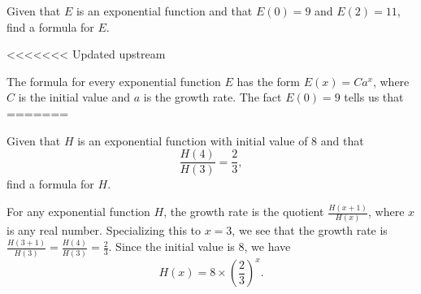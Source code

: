 \documentclass[12pt,fleqn,answers]{exam}
\begin{document}
\begin{questions} 

\question [2] Given that $E$ is an exponential function and that $E(0)=9$
and $E(2) = 11$, find a formula for $E$.

<<<<<<< Updated upstream
\begin{solution}[2.5in]  The formula for every exponential function $E$ has the 
    form $E(x) = C a^x$, where $C$ is the initial value and $a$ is the growth rate.
    The fact  $E(0)=9$ tells us that
=======

\question [2] Given that $H$ is an exponential function with
initial value of $8$ and that
\begin{equation*}
   \frac{H(4)}{H(3)} = \frac{2}{3},
\end{equation*}
find a formula for $H$.
\begin{solution}%
    For any exponential function $H$, the growth rate is the quotient
    $\frac{H(x+1)}{H(x)}$, where $x$ is any real number. Specializing this 
    to $x=3$, we see that the
    growth rate is $\frac{H(3+1)}{H(3)} =  \frac{H(4)}{H(3)} = \frac{2}{3}$. Since the initial value is $8$, we
    have
    \begin{equation*}
        H(x) = 8 \times \left(\frac{2}{3} \right)^x.
    \end{equation*}


\end{solution}
\end{solution}
\end{questions}
\end{document}
